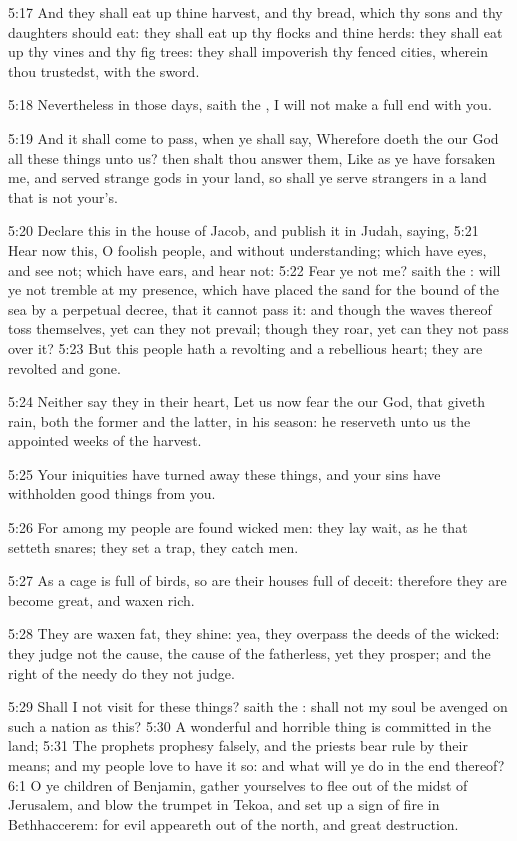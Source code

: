 5:17 And they shall eat up thine harvest, and thy bread, which thy
sons and thy daughters should eat: they shall eat up thy flocks and
thine herds: they shall eat up thy vines and thy fig trees: they shall
impoverish thy fenced cities, wherein thou trustedst, with the sword.

5:18 Nevertheless in those days, saith the \LORD, I will not make a
full end with you.

5:19 And it shall come to pass, when ye shall say, Wherefore doeth the
\LORD our God all these things unto us? then shalt thou answer them,
Like as ye have forsaken me, and served strange gods in your land, so
shall ye serve strangers in a land that is not your's.

5:20 Declare this in the house of Jacob, and publish it in Judah,
saying, 5:21 Hear now this, O foolish people, and without
understanding; which have eyes, and see not; which have ears, and hear
not: 5:22 Fear ye not me? saith the \LORD: will ye not tremble at my
presence, which have placed the sand for the bound of the sea by a
perpetual decree, that it cannot pass it: and though the waves thereof
toss themselves, yet can they not prevail; though they roar, yet can
they not pass over it?  5:23 But this people hath a revolting and a
rebellious heart; they are revolted and gone.

5:24 Neither say they in their heart, Let us now fear the \LORD our
God, that giveth rain, both the former and the latter, in his season:
he reserveth unto us the appointed weeks of the harvest.

5:25 Your iniquities have turned away these things, and your sins have
withholden good things from you.

5:26 For among my people are found wicked men: they lay wait, as he
that setteth snares; they set a trap, they catch men.

5:27 As a cage is full of birds, so are their houses full of deceit:
therefore they are become great, and waxen rich.

5:28 They are waxen fat, they shine: yea, they overpass the deeds of
the wicked: they judge not the cause, the cause of the fatherless, yet
they prosper; and the right of the needy do they not judge.

5:29 Shall I not visit for these things? saith the \LORD: shall not my
soul be avenged on such a nation as this?  5:30 A wonderful and
horrible thing is committed in the land; 5:31 The prophets prophesy
falsely, and the priests bear rule by their means; and my people love
to have it so: and what will ye do in the end thereof?  6:1 O ye
children of Benjamin, gather yourselves to flee out of the midst of
Jerusalem, and blow the trumpet in Tekoa, and set up a sign of fire in
Bethhaccerem: for evil appeareth out of the north, and great
destruction.

